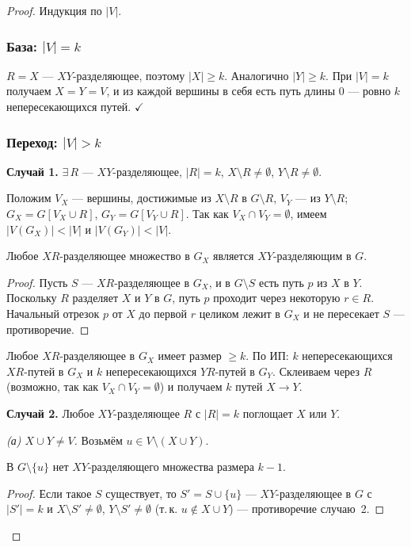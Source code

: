 \begin{proof}
  Индукция по $|V|$.

  \subsubsection*{База: $|V| = k$}

  $R = X$ — $XY$-разделяющее, поэтому $|X| \ge k$.
  Аналогично $|Y| \ge k$. При $|V|=k$ получаем $X=Y=V$,
  и из каждой вершины в себя есть путь длины $0$ — ровно $k$ непересекающихся путей. $\checkmark$

  \subsubsection*{Переход: $|V| > k$}

  \noindent\textbf{Случай 1.}
  $\exists\, R$ — $XY$-разделяющее, $|R|=k$,
  $X\setminus R \neq \emptyset$, $Y\setminus R \neq \emptyset$.

  Положим $V_X$ — вершины, достижимые из $X\setminus R$ в $G\setminus R$,
  $V_Y$ — из $Y\setminus R$; $G_X=G[V_X\cup R]$, $G_Y=G[V_Y\cup R]$.
  Так как $V_X\cap V_Y=\emptyset$, имеем $|V(G_X)|<|V|$ и $|V(G_Y)|<|V|$.

  \begin{Statement}{}{}
    Любое $XR$-разделяющее множество в $G_X$ является $XY$-разделяющим в $G$.
  \end{Statement}
  \begin{proof}
    Пусть $S$ — $XR$-разделяющее в $G_X$, и в $G\setminus S$ есть путь $p$ из $X$ в $Y$.
    Поскольку $R$ разделяет $X$ и $Y$ в $G$, путь $p$ проходит через некоторую $r\in R$.
    Начальный отрезок $p$ от $X$ до первой $r$ целиком лежит в $G_X$ и не пересекает $S$
    — противоречие.
  \end{proof}

  Любое $XR$-разделяющее в $G_X$ имеет размер $\ge k$.
  По ИП: $k$ непересекающихся $XR$-путей в $G_X$ и $k$ непересекающихся $YR$-путей в $G_Y$.
  Склеиваем через $R$ (возможно, так как $V_X\cap V_Y=\emptyset$) и получаем $k$ путей $X\to Y$.

  \medskip
  \noindent\textbf{Случай 2.}
  Любое $XY$-разделяющее $R$ с $|R|=k$ поглощает $X$ или $Y$.

  \noindent\textit{(а) $X\cup Y \neq V$.}
  Возьмём $u \in V\setminus(X\cup Y)$.

  \begin{Statement}{}{}
    В $G\setminus\{u\}$ нет $XY$-разделяющего множества размера $k-1$.
  \end{Statement}
  \begin{proof}
    Если такое $S$ существует, то $S' = S\cup\{u\}$ — $XY$-разделяющее в $G$
    с $|S'|=k$ и $X\setminus S'\neq\emptyset$, $Y\setminus S'\neq\emptyset$
    (т.\,к. $u\notin X\cup Y$) — противоречие случаю~2.
  \end{proof}


\end{proof}
